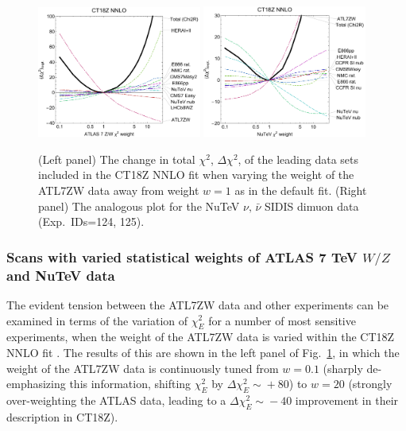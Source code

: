 \begin{figure}[htbp]
\begin{center}
	\includegraphics[width=0.48\textwidth]{./fig/ATL7ZWWT_scan2Tct18z.pdf}\quad
	\includegraphics[width=0.48\textwidth]{./fig/NuTeVWT_scan2Tct18z.pdf}
	\caption{(Left panel) The change in total $\chi^2$, $\Delta \chi^2$, of the leading data sets included in the CT18Z NNLO fit
	when varying the weight of the ATL7ZW data away from weight $w\!=\!1$ as in the default fit. (Right panel)
	The analogous plot for the NuTeV $\nu,\, \bar{\nu}$ SIDIS dimuon data (Exp.~IDs=124, 125).
	}
\label{fig:lm_wht}
\end{center}
\end{figure}

\subsubsection{Scans with varied statistical weights of ATLAS 7 TeV $W/Z$ and NuTeV data}
\label{sec:ATL7ZWchi2wt}

The evident tension between the ATL7ZW data and other experiments can
be examined in terms of the variation of $\chi^2_E$ for a number of 
most sensitive experiments, when the weight of the ATL7ZW data is varied
within the CT18Z NNLO fit \cite{Collins:2001es}.  
The results of this are shown in the left panel of
Fig.~\ref{fig:lm_wht}, in which the weight of the ATL7ZW data is
continuously tuned from $w\!=\!0.1$ (sharply de-emphasizing this information, shifting $\chi^2_E$ by $\Delta \chi^2_E\! \sim\! +80$)
to $w\!=\!20$ (strongly over-weighting the ATLAS data, leading to a
$\Delta \chi^2_E\! \sim\! -40$ improvement in their description in CT18Z). 

